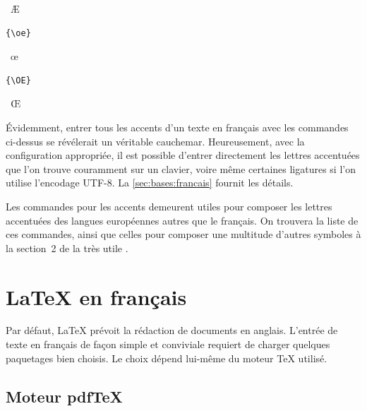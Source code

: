 {\begin{demo}
\begin{minipage}{0.2\linewidth}
\begin{texample}
      \producing\ \AE
    \end{texample}
  \end{minipage}
  \hfill
  \begin{minipage}{0.2\linewidth}
    \begin{texample}
\begin{lstlisting}
{\oe}
\end{lstlisting}
      \producing\ \oe
    \end{texample}
  \end{minipage}
  \hfill
  \begin{minipage}{0.2\linewidth}
    \begin{texample}
\begin{lstlisting}
{\OE}
\end{lstlisting}
      \producing\ \OE
    \end{texample}
  \end{minipage}
\end{demo}

Évidemment, entrer tous les accents d'un texte en français avec les
commandes ci-dessus se révélerait un véritable cauchemar.
Heureusement, avec la configuration appropriée, il est possible
d'entrer directement les lettres accentuées que l'on trouve couramment
sur un clavier, voire même certaines ligatures si l'on utilise
l'encodage UTF-8. La \autoref{sec:bases:francais} fournit les détails.

Les commandes pour les accents demeurent utiles pour composer les
lettres accentuées des langues européennes autres que le français. On
trouvera la liste de ces commandes, ainsi que celles pour composer une
multitude d'autres symboles à la section~2 de la très utile %
\citep{comprehensive}.


\section{{\LaTeX} en français}
\label{sec:bases:francais}

Par défaut, LaTeX prévoit la rédaction de documents en anglais.
L'entrée de texte en français de façon simple et conviviale requiert
de charger quelques paquetages bien choisis. Le choix dépend lui-même
du moteur {\TeX} utilisé.

\subsection{Moteur pdf\TeX}
\label{sec:bases:francais:pdftex}

}
